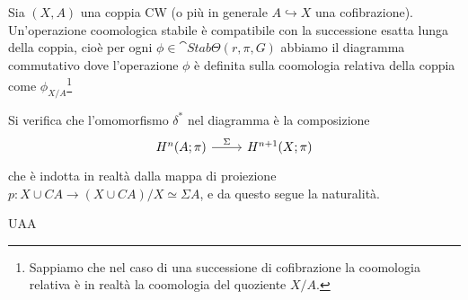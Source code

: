 	\begin{thm}
		Sia $(X,A)$ una coppia CW (o più in generale $A \hookrightarrow X$ una cofibrazione).
		Un'operazione coomologica stabile è compatibile con la successione esatta lunga della coppia,
		cioè per ogni $\phi \in \cat{Stab}\Theta(r,\pi,G)$ abbiamo
		il diagramma commutativo
		dove l'operazione $\phi$ è definita sulla coomologia relativa
		della coppia come $\phi_{X/A}$\footnote{Sappiamo che nel caso di una successione di cofibrazione la coomologia relativa è in realtà la coomologia del quoziente $X/A$.}
	\end{thm}
	
	\begin{oss}
		Si verifica che l'omomorfismo $\delta^{*}$ nel diagramma
		è la composizione
		\begin{equation*}
			\begin{tikzcd}
				H^{n}(A;\pi) \ar[r, "\Sigma"]
				& H^{n+1}(X;\pi)
			\end{tikzcd}
		\end{equation*}
		che è indotta in realtà dalla mappa di proiezione
			$p:X \cup CA \to (X \cup CA)/X \simeq \Sigma A$,
		e da questo segue la naturalità.
	\end{oss}
	
	UAA
